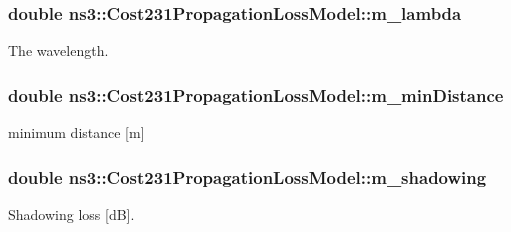 \subsubsection[{\texorpdfstring{m\+\_\+lambda}{m_lambda}}]{\setlength{\rightskip}{0pt plus 5cm}double ns3\+::\+Cost231\+Propagation\+Loss\+Model\+::m\+\_\+lambda\hspace{0.3cm}{\ttfamily [private]}}\hypertarget{classns3_1_1Cost231PropagationLossModel_a24ca1169081f00f44d025f6a10bf6db0}{}\label{classns3_1_1Cost231PropagationLossModel_a24ca1169081f00f44d025f6a10bf6db0}


The wavelength. 

\subsubsection[{\texorpdfstring{m\+\_\+min\+Distance}{m_minDistance}}]{\setlength{\rightskip}{0pt plus 5cm}double ns3\+::\+Cost231\+Propagation\+Loss\+Model\+::m\+\_\+min\+Distance\hspace{0.3cm}{\ttfamily [private]}}\hypertarget{classns3_1_1Cost231PropagationLossModel_ac4373b88bf096cdd4169ef5c8537b80e}{}\label{classns3_1_1Cost231PropagationLossModel_ac4373b88bf096cdd4169ef5c8537b80e}


minimum distance \mbox{[}m\mbox{]} 

\subsubsection[{\texorpdfstring{m\+\_\+shadowing}{m_shadowing}}]{\setlength{\rightskip}{0pt plus 5cm}double ns3\+::\+Cost231\+Propagation\+Loss\+Model\+::m\+\_\+shadowing\hspace{0.3cm}{\ttfamily [private]}}\hypertarget{classns3_1_1Cost231PropagationLossModel_af6164bb5b4a4b4882061049be33bd5e1}{}\label{classns3_1_1Cost231PropagationLossModel_af6164bb5b4a4b4882061049be33bd5e1}


Shadowing loss \mbox{[}dB\mbox{]}. 

